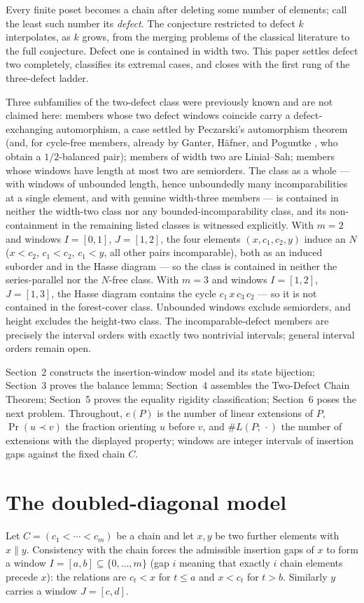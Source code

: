 \documentclass[11pt]{article}
\theoremstyle{definition}
\theoremstyle{remark}
\newcommand{\pr}{\operatorname{Pr}}
\begin{document}
Every finite poset becomes a chain after deleting some number of elements; call the least
such number its \emph{defect}. The conjecture restricted to defect $k$ interpolates, as
$k$ grows, from the merging problems of the classical literature to the full conjecture.
Defect one is contained in width two. This paper settles defect two completely, classifies
its extremal cases, and closes with the first rung of the three-defect ladder.

Three subfamilies of the two-defect class were previously known and are not claimed here:
members whose two defect windows coincide carry a defect-exchanging automorphism, a case
settled by Peczarski's automorphism theorem \cite{peczarski-aut} (and, for cycle-free
members, already by Ganter, H\"afner, and Poguntke \cite{ghp}, who obtain a $1/2$-balanced
pair); members of width two are Linial--Sah; members whose windows have
length at most two are semiorders. The class as a whole --- with windows of unbounded length, hence unboundedly many
incomparabilities at a single element, and with genuine width-three members --- is
contained in neither the width-two class nor any bounded-incomparability class, and its
non-containment in the remaining listed classes is witnessed explicitly. With $m=2$ and
windows $I=[0,1]$, $J=[1,2]$, the four elements $(x,c_1,c_2,y)$ induce an $N$ ($x<c_2$,
$c_1<c_2$, $c_1<y$, all other pairs incomparable), both as an induced suborder and in
the Hasse diagram --- so the class is contained in neither the series-parallel nor the
$N$-free class. With $m=3$ and windows $I=[1,2]$, $J=[1,3]$, the Hasse diagram contains
the cycle $c_1\,x\,c_3\,c_2$ --- so it is not contained in the forest-cover class.
Unbounded windows exclude semiorders, and height excludes the height-two class. The incomparable-defect
members are precisely the interval orders with exactly two nontrivial intervals; general
interval orders remain open.

Section~2 constructs the insertion-window model and its state bijection; Section~3
proves the balance lemma; Section~4 assembles the Two-Defect Chain Theorem; Section~5
proves the equality rigidity classification; Section~6 poses the next problem. Throughout, $e(P)$ is the number of linear
extensions of $P$, $\pr(u\prec v)$ the fraction orienting $u$ before $v$, and
$\#L(P;\,\cdot)$ the number of extensions with the displayed property; windows are
integer intervals of insertion gaps against the fixed chain $C$.

\section{The doubled-diagonal model}
Let $C=(c_1<\cdots<c_m)$ be a chain and let $x,y$ be two further elements with
$x\parallel y$. Consistency with the chain forces the admissible insertion gaps of $x$ to
form a window $I=[a,b]\subseteq\{0,\dots,m\}$ (gap $i$ meaning that exactly $i$ chain
elements precede $x$): the relations are $c_t<x$ for $t\le a$ and $x<c_{t}$ for $t>b$.
Similarly $y$ carries a window $J=[c,d]$.
\end{document}
